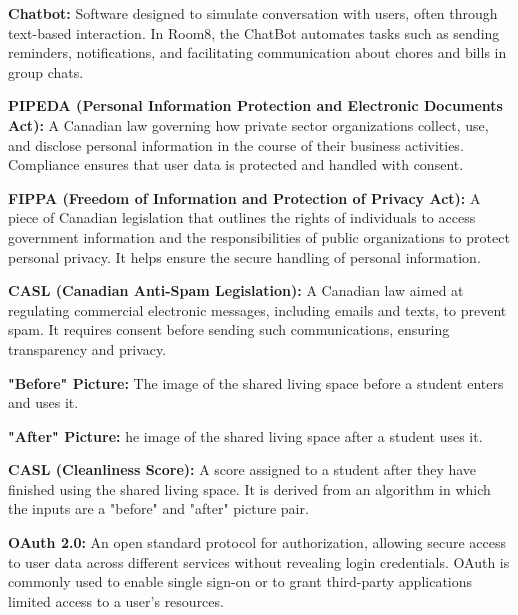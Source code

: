 \documentclass{scrreprt}
\theoremstyle{definition}
\begin{document}
\begin{flushleft}
    \item \textbf{Chatbot:} Software designed to simulate conversation with users, often through text-based interaction. In Room8, the ChatBot automates tasks such as sending reminders, notifications, and facilitating communication about chores and bills in group chats.\newline

    \item \textbf{PIPEDA (Personal Information Protection and Electronic Documents Act):} A Canadian law governing how private sector organizations collect, use, and disclose personal information in the course of their business activities. Compliance ensures that user data is protected and handled with consent.\newline

    \item \textbf{FIPPA (Freedom of Information and Protection of Privacy Act):} A piece of Canadian legislation that outlines the rights of individuals to access government information and the responsibilities of public organizations to protect personal privacy. It helps ensure the secure handling of personal information.\newline

    \item \textbf{CASL (Canadian Anti-Spam Legislation):} A Canadian law aimed at regulating commercial electronic messages, including emails and texts, to prevent spam. It requires consent before sending such communications, ensuring transparency and privacy.\newline

    \item \textbf{"Before" Picture:} The image of the shared living space before a student enters and uses it.\newline

    \item \textbf{"After" Picture:} he image of the shared living space after a student uses it.\newline

    \item \textbf{CASL (Cleanliness Score):} A score assigned to a student after they have finished using the shared living space. It is derived from an algorithm in which the inputs are a "before" and "after" picture pair.\newline

    \item \textbf{OAuth 2.0:} An open standard protocol for authorization, allowing secure access to user data across different services without revealing login credentials. OAuth is commonly used to enable single sign-on or to grant third-party applications limited access to a user's resources.\newline


\end{flushleft}
\end{document}

